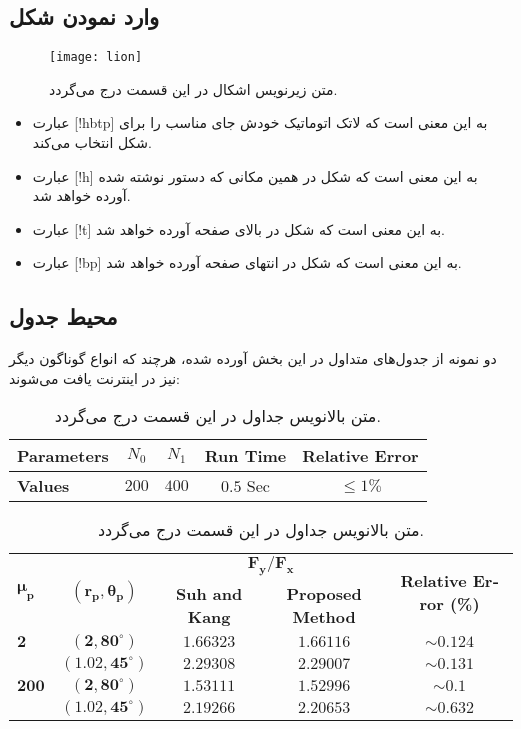 \subsection{وارد نمودن شکل}
\begin{figure}[!hbtp]
\centering
\texttt{[image: lion]}
\caption{متن زیرنویس اشکال در این قسمت درج می‌گردد.}
\label{fig: lion}
\end{figure}
\begin{itemize}
\item 
عبارت
[!hbtp]
به این معنی است که لاتک اتوماتیک خودش جای مناسب را برای شکل انتخاب می‌کند.
\item 
عبارت 
[!h]
 به این معنی است که شکل در همین مکانی که دستور نوشته شده آورده خواهد شد.
\item
 عبارت
[!t] 
 به این معنی است که شکل در بالای صفحه آورده خواهد شد.
\item
 عبارت
 [!bp] 
به این معنی است که شکل در انتهای صفحه آورده خواهد شد.
\end{itemize}
\subsection{محیط جدول}
دو نمونه از جدول‌های متداول در این بخش آورده شده، هرچند که انواع گوناگون دیگر نیز در اینترنت یافت می‌شوند:
\begin{table}[!hbtp]
\caption{متن بالانویس جداول در این قسمت درج می‌گردد.}
\centering
\label{Tab: ParametersValues}
\begin{latin}
\begin{tabular}{|l|c|c|c|c|}
\hline
{\bf Parameters} & $N_0$ & $N_1$ & Run Time & Relative Error\\
\hline
{\bf Values} & $200$ & $400$ & $0.5$ Sec & $\leq 1\%$\\
\hline
\end{tabular}
\end{latin}
\end{table}
\begin{table}[!hbtp]
\caption{متن بالانویس جداول در این قسمت درج می‌گردد.}
\centering
\label{Tab: magforce1}
\begin{latin}
\begin{tabular}{lcccc}
\toprule
\multirow{2}{*}{$\boldsymbol{\mu_p}$} & \multirow{2}{*}{$\boldsymbol{(r_p,\theta_p)}$} & \multicolumn{2}{c}{$\boldsymbol{F_{y} / F_{x}}$} & \multirow{2}{*}{{\bf Relative Error (\%)}}\\
\cmidrule(r){3-4}
& & {\bf Suh and Kang}\cite{KangImmersed2011} & {\bf Proposed Method}\\
\midrule \midrule
$\boldsymbol{2}$ & $\boldsymbol{(2,80^{\circ})}$ & $1.66323$ & $1.66116$ & $\sim0.124$\\
& $\boldsymbol{(1.02,45^{\circ})}$ & $2.29308$ & $2.29007$ & $\sim0.131$\\ [4mm]
$\boldsymbol{200}$ & $\boldsymbol{(2,80^{\circ})}$ & $1.53111$ & $1.52996$ & $\sim0.1$\\
& $\boldsymbol{(1.02,45^{\circ})}$ & $2.19266$ & $2.20653$ & $\sim0.632$\\
\bottomrule
\end{tabular}
\end{latin}
\end{table}
